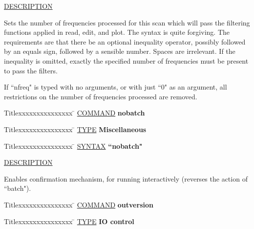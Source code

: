\underline{DESCRIPTION}
\begin{list}{}{\setlength{\leftmargin}{0.5in}
     \setlength{\rightmargin}{0in}}
\item
Sets the number of frequencies processed for this scan which
will pass the filtering functions applied in read, edit, and
plot.  The syntax is quite forgiving.  The requirements are
that there be an optional inequality operator, possibly followed 
by an equals sign, followed by a sensible number.  Spaces are 
irrelevant.  If the inequality is omitted, exactly the specified
number of frequencies must be present to pass the filters.
\item
If ``nfreq" is typed with no arguments, or with just ``0" as an 
argument, all restrictions on the number of frequencies 
processed are removed.
\item
\end{list}
\vspace{.2in}

\begin{tabbing}
Titlexxxxxxxxxxxxxxx \= \kill
\underline{COMMAND} \> {\bf 	nobatch} \\
\end{tabbing}

\begin{tabbing}
Titlexxxxxxxxxxxxxxx \= \kill
\underline{TYPE} \> {\bf 		Miscellaneous} \\
\end{tabbing}

\begin{tabbing}
Titlexxxxxxxxxxxxxxx \= \kill
\underline{SYNTAX} \> {\bf 		``nobatch"} \\
\end{tabbing}

\underline{DESCRIPTION}
\begin{list}{}{\setlength{\leftmargin}{0.5in}
     \setlength{\rightmargin}{0in}}
\item
Enables confirmation mechanism, for running interactively
(reverses the action of ``batch").
\end{list}
\vspace{.2in}

\begin{tabbing}
Titlexxxxxxxxxxxxxxx \= \kill
\underline{COMMAND} \> {\bf 	outversion} \\
\end{tabbing}

\begin{tabbing}
Titlexxxxxxxxxxxxxxx \= \kill
\underline{TYPE} \> {\bf 		IO control} \\
\end{tabbing}

